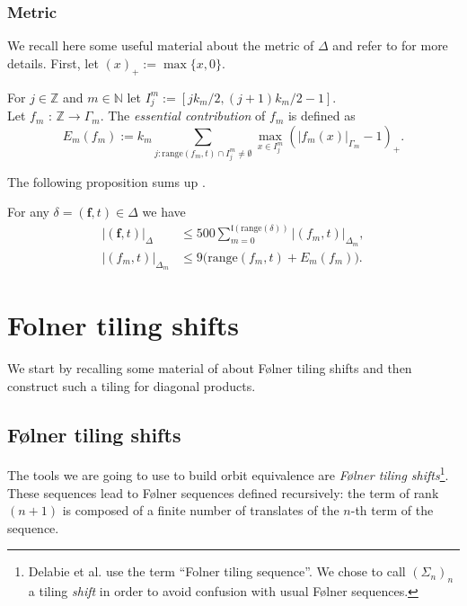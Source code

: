 \documentclass[english, 11pt, a4paper]{article}
\newcommand{\deffont}[1]{\emph{#1}}
\theoremstyle{definition}
\numberwithin{equation}{section}
\newcommand{\bN}{\mathbb{N}}
\newcommand{\bZ}{\mathbb{Z}}
\newcommand{\mbff}{\boldsymbol{f}}
\newcommand{\BZ}{\Delta}
\newcommand{\range}{\mathrm{range}}
\newcommand{\landing}{\mathfrak{l}}
\begin{document}
\subsubsection{Metric}

We recall here some useful material about the metric of $\BZ$ and refer to
\cite[Section 2.2]{BZ} for more details. 
First, let $(x)_+:=\max\{x,0\}$.
\begin{Def}\label{Def:Em}
 For $j\in \bZ$ and $m\in \bN$ let $I^m_{j}:=[jk_m/2,(j+1)k_m/2-1]$.\\
 Let $f_m$ : $\bZ \rightarrow
 \Gamma_m$. The \deffont{essential contribution} of $f_m$ is defined as
 \begin{equation*}
   E_m(f_m):= k_m \sum_{j: \range(f_m,t)\cap I^m_j \neq \emptyset}
   \max_{x\in I^m_j} \left( |f_m(x)|_{\Gamma_m}-1 \right)_{+}.
 \end{equation*}
\end{Def}

The following proposition sums up \cite[Lemma 2.13, Proposition 2.14]{BZ}.
\begin{Prop}\label{Prop:metric}
  For any $\delta=(\mbff,t) \in \BZ$ we have
  \begin{align*}
    \left\vert {(\mbff,t)}\right\vert_{\BZ}
    & \leq 500 \sum^{\landing\left( \range(\delta) \right)}_{m=0} |(f_m,t)|_{\BZ_m},\\
     |(f_m,t)|_{\BZ_m} &\leq 9 \big( \range(f_m,t) + E_m(f_m)  \big).
  \end{align*}
\end{Prop}
\section{Folner tiling shifts}\label{Sec:FOTS}
We start by recalling some material of \cite{DKLMT} about Følner tiling
shifts and then construct such a tiling for diagonal products.

\subsection{Følner tiling shifts}\label{Subsec:FOTS}
The tools we are going to use to build orbit equivalence are \emph{Følner tiling
  shifts}\footnote{Delabie et al. \cite{DKLMT} use the term “Folner tiling
  sequence”. We chose to call $(\Sigma_n)_n$ a tiling \emph{shift} in 
    order to avoid confusion with usual Følner sequences.}. These 
sequences lead to Følner sequences defined recursively: the term of rank $(n+1)$ is
composed of a finite number of translates of the $n$-th term of the sequence. 
\end{document}
